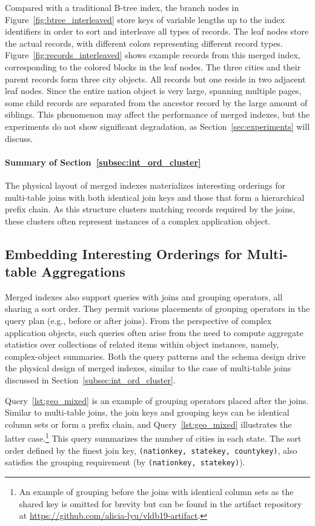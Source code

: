 \documentclass[sigconf, pdfa, nonacm]{acmart}
\newcommand\summary[1]{\paragraph{\textbf{#1}}}
\newcommand\vldbavailabilityurl{https://github.com/alicia-lyu/vldb19-artifact}
\begin{document}
Compared with a traditional B-tree index, the branch nodes in Figure~\ref{fig:btree_interleaved} store keys of variable lengths up to the index identifiers in order to sort and interleave all types of records.
The leaf nodes store the actual records, with different colors representing different record types.
Figure~\ref{fig:records_interleaved} shows example records from this merged index, corresponding to the colored blocks in the leaf nodes.
The three cities and their parent records form three city objects.
All records but one reside in two adjacent leaf nodes.
Since the entire nation object is very large, spanning multiple pages, some child records are separated from the ancestor record by the large amount of siblings.
This phenomenon may affect the performance of merged indexes, but the experiments do not show significant degradation, as Section~\ref{sec:experiments} will discuss.

\summary{Summary of Section~\ref{subsec:int_ord_cluster}}\label{para:rest_notes}

The physical layout of merged indexes materializes interesting orderings for multi-table joins with both identical join keys and those that form a hierarchical prefix chain. As this structure clusters matching records required by the joins, these clusters often represent instances of a complex application object.

\subsection{Embedding Interesting Orderings for Multi-table Aggregations}\label{subsec:int_ord_group}

Merged indexes also support queries with joins and grouping operators, all sharing a sort order. They permit various placements of grouping operators in the query plan (e.g., before or after joins). From the perspective of complex application objects, such queries often arise from the need to compute aggregate statistics over collections of related items within object instances, namely, complex-object summaries.
Both the query patterns and the schema design drive the physical design of merged indexes, similar to the case of multi-table joins discussed in Section~\ref{subsec:int_ord_cluster}.

Query~\ref{lst:geo_mixed} is an example of grouping operators placed after the joins.
Similar to multi-table joins, the join keys and grouping keys can be identical column sets or form a prefix chain, and Query~\ref{lst:geo_mixed} illustrates the latter case.\footnote{An example of grouping before the joins with identical column sets as the shared key is omitted for brevity but can be found in the artifact repository at \url{\vldbavailabilityurl}.}
This query summarizes the number of cities in each state.
The sort order defined by the finest join key, \texttt{(nationkey, statekey, countykey)}, also satisfies the grouping requirement (by \texttt{(nationkey, statekey)}).
\end{document}
